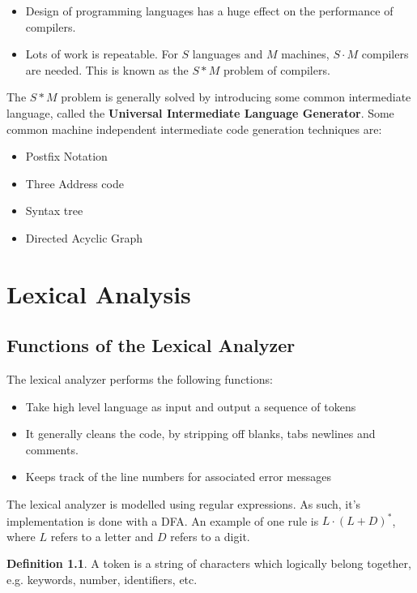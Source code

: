 \documentclass[12pt,letterpaper]{amsbook}
\theoremstyle{definition}
\newtheorem{definition}{Definition}[section] %
\begin{document}
\begin{itemize}
  \item Design of programming languages has a huge effect on the performance of compilers.
  \item Lots of work is repeatable. For $S$ languages and $M$ machines, $S\cdot M$ compilers are needed. This is known as the $S*M$ problem of compilers.
\end{itemize}

The $S*M$ problem is generally solved by introducing some common intermediate language, called the \textbf{Universal Intermediate Language Generator}. Some common machine independent intermediate code generation techniques are:

\begin{itemize}
  \item Postfix Notation
  \item Three Address code
  \item Syntax tree
  \item Directed Acyclic Graph
\end{itemize}


\chapter{Lexical Analysis}

\section{Functions of the Lexical Analyzer}

The lexical analyzer performs the following functions:

\begin{itemize}
  \item Take high level language as input and output a sequence of tokens
  \item It generally cleans the code, by stripping off blanks, tabs newlines and comments.
  \item Keeps track of the line numbers for associated error messages
\end{itemize}

The lexical analyzer is modelled using regular expressions. As such, it's implementation is done with a DFA. An example of one rule is $L \cdot (L+D)^*$, where $L$ refers to a letter and $D$ refers to a digit.

\begin{definition}
  A token is a string of characters which logically belong together, e.g. keywords, number, identifiers, etc.
\end{definition}
\end{document}
